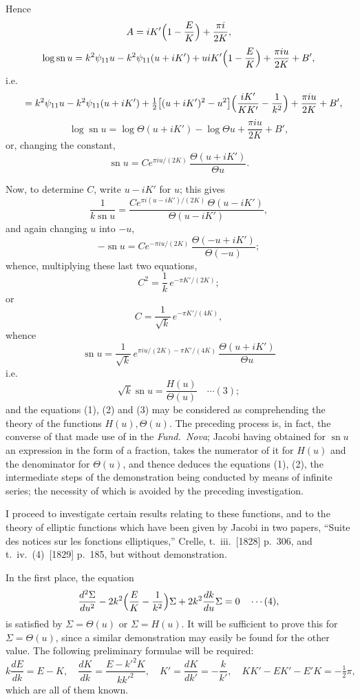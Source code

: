 \documentclass[12pt,a4paper]{article}
\begin{document}
Hence
\[
A = iK'\Bigl(1 - \frac{E}{K}\Bigr) + \frac{\pi i}{2K},
\]
\[
\log\operatorname{sn} u = k^2\psi_{11} u - k^2\psi_{11}(u + iK') + uiK'\Bigl(1 - \frac{E}{K}\Bigr) + \frac{\pi i u}{2K} + B',
\]
i.e.
\[
\quad = k^2\psi_{11} u - k^2\psi_{11}(u + iK') + \tfrac12\bigl[(u + iK')^2 - u^2\bigr]\Bigl(\frac{iK'}{KK'} - \frac{1}{k^2}\Bigr) + \frac{\pi i u}{2K} + B',
\]
\[
\log\operatorname{sn} u = \log\Theta(u + iK') - \log\Theta u + \frac{\pi i u}{2K} + B',
\]
or, changing the constant,
\[
\operatorname{sn} u = C e^{\pi i u/(2K)}\,\frac{\Theta(u + iK')}{\Theta u}.
\]

Now, to determine $C$, write $u - iK'$ for $u$; this gives
\[
\frac{1}{k\operatorname{sn} u} = \frac{C e^{\pi i(u - iK')/(2K)}\,\Theta(u - iK')}{\Theta(u - iK')},
\]
and again changing $u$ into $-u$,
\[
-\operatorname{sn} u = C e^{-\pi i u/(2K)}\,\frac{\Theta(-u + iK')}{\Theta(-u)};
\]
whence, multiplying these last two equations,
\[
C^2 = \frac{1}{k}\,e^{-\pi K'/(2K)};
\]
or
\[
C = \frac{1}{\sqrt{k}}\,e^{-\pi K'/(4K)},
\]
whence
\[
\operatorname{sn} u = \frac{1}{\sqrt{k}}\,e^{\pi i u/(2K) - \pi K'/(4K)}\,\frac{\Theta(u + iK')}{\Theta u}
\]
i.e.
\[
\sqrt{k}\operatorname{sn} u = \frac{H(u)}{\Theta(u)} \quad\cdots(3);
\]
and the equations (1), (2) and (3) may be considered as comprehending the theory of the functions $H(u), \Theta(u)$. The preceding process is, in fact, the converse of that made use of in the \emph{Fund.~Nova}; Jacobi having obtained for $\operatorname{sn} u$ an expression in the form of a fraction, takes the numerator of it for $H(u)$ and the denominator for $\Theta(u)$, and thence deduces the equations (1), (2), the intermediate steps of the demonstration being conducted by means of infinite series; the necessity of which is avoided by the preceding investigation.

I proceed to investigate certain results relating to these functions, and to the theory of elliptic functions which have been given by Jacobi in two papers, ``Suite des notices sur les fonctions elliptiques,'' Crelle, t.~iii.~[1828] p.~306, and t.~iv.~(4)~[1829] p.~185, but without demonstration.

In the first place, the equation
\[
\frac{d^2 \Sigma}{du^2} - 2 k^2\Bigl(\frac{E}{K} - \frac{1}{k^2}\Bigr)\Sigma + 2k^2\frac{dk}{du}\Sigma = 0 \quad\cdots(4),
\]
is satisfied by $\Sigma = \Theta(u)$ or $\Sigma = H(u)$. It will be sufficient to prove this for $\Sigma = \Theta(u)$, since a similar demonstration may easily be found for the other value. The following preliminary formulae will be required:
\[
k\frac{dE}{dk} = E - K,\quad \frac{dK}{dk} = \frac{E - k'^2 K}{k k'^2},\quad K' = \frac{dK}{dk'} = -\frac{k}{k'},\quad KK' - EK' - E'K = -\tfrac12\pi,
\]
which are all of them known.
\end{document}
